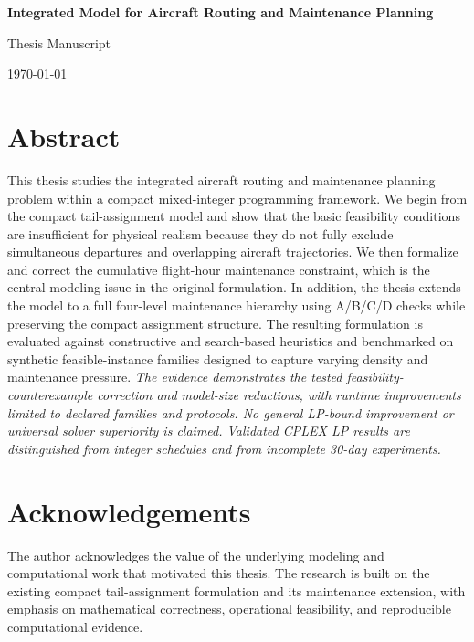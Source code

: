\documentclass[12pt,a4paper]{report}
\begin{document}
\hypersetup{pageanchor=false}
\begin{titlepage}
    \centering
    \vspace*{2cm}
    {\LARGE \bfseries Integrated Model for Aircraft Routing and Maintenance Planning\par}
    \vspace{1.5cm}
    {\Large Thesis Manuscript\par}
    \vspace{4cm}
    {\large \today\par}
\end{titlepage}
\hypersetup{pageanchor=true}

\chapter*{Abstract}
This thesis studies the integrated aircraft routing and maintenance planning problem within a compact mixed-integer programming framework. We begin from the compact tail-assignment model and show that the basic feasibility conditions are insufficient for physical realism because they do not fully exclude simultaneous departures and overlapping aircraft trajectories. We then formalize and correct the cumulative flight-hour maintenance constraint, which is the central modeling issue in the original formulation. In addition, the thesis extends the model to a full four-level maintenance hierarchy using A/B/C/D checks while preserving the compact assignment structure. The resulting formulation is evaluated against constructive and search-based heuristics and benchmarked on synthetic feasible-instance families designed to capture varying density and maintenance pressure. \textit{The evidence demonstrates the tested feasibility-counterexample correction and model-size reductions, with runtime improvements limited to declared families and protocols. No general LP-bound improvement or universal solver superiority is claimed. Validated CPLEX LP results are distinguished from integer schedules and from incomplete 30-day experiments.}

\chapter*{Acknowledgements}
The author acknowledges the value of the underlying modeling and computational work that motivated this thesis. The research is built on the existing compact tail-assignment formulation and its maintenance extension, with emphasis on mathematical correctness, operational feasibility, and reproducible computational evidence.
\end{document}
